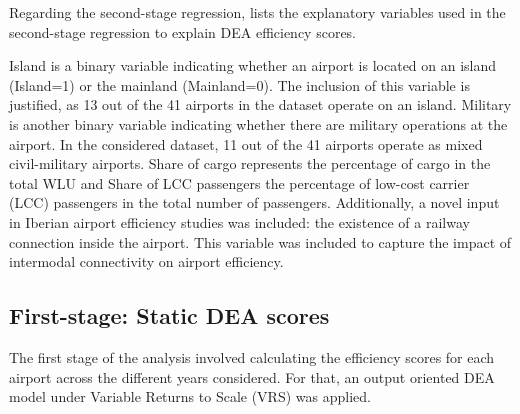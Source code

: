 Regarding the second-stage regression,  lists the explanatory variables used in the second-stage regression to explain DEA efficiency scores.

\vspace{-0.2cm}
\begin{table}[h!]
  \begin{center}
        \caption{Summary Statistics for explanatory variables}
    \label{tab:exp_statistics}
  \end{center}
\end{table}
  
\vspace{-0.5cm}
Island is a binary variable indicating whether an airport is located on an island (Island=1) or the
mainland (Mainland=0). The inclusion of this variable is justified, as 13 out of the 41 airports in the
dataset operate on an island. Military is another binary variable indicating whether there are military
operations at the airport. In the considered dataset, 11 out of the 41 airports operate as mixed civil-military airports.
Share of cargo represents the percentage of cargo in the total WLU and Share of LCC passengers the percentage of low-cost carrier (LCC) passengers in the total
number of passengers. 
Additionally, a novel input in Iberian airport efficiency studies was included: the existence of a railway connection inside the airport. This variable was included to capture the impact of intermodal connectivity on airport efficiency.







\subsection{First-stage: Static DEA scores}
\label{subsec:resul_dea}  
The first stage of the analysis involved calculating the efficiency scores for each airport across the
different years considered. For that, an output oriented DEA model under Variable Returns to Scale
(VRS) was applied.


